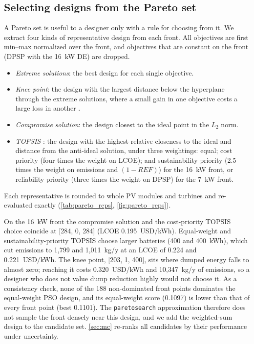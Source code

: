 \documentclass[final,3p,times]{elsarticle}
\begin{document}
\subsection{Selecting designs from the Pareto set\label{sec:pareto_select}}
A Pareto set is useful to a designer only with a rule for choosing from it. We extract four kinds of representative design from each front. All objectives are first min--max normalized over the front, and objectives that are constant on the front (DPSP with the 16~kW DE) are dropped.
\begin{itemize}
\item \textit{Extreme solutions}: the best design for each single objective.
\item \textit{Knee point}: the design with the largest distance below the hyperplane through the extreme solutions, where a small gain in one objective costs a large loss in another \cite{deb2011knee}.
\item \textit{Compromise solution}: the design closest to the ideal point in the $L_2$ norm.
\item \textit{TOPSIS} \cite{hwang1981topsis}: the design with the highest relative closeness to the ideal and distance from the anti-ideal solution, under three weightings: equal; cost priority (four times the weight on LCOE); and sustainability priority (2.5 times the weight on emissions and $(1-REF)$) for the 16~kW front, or reliability priority (three times the weight on DPSP) for the 7~kW front.
\end{itemize}
Each representative is rounded to whole PV modules and turbines and re-evaluated exactly (\cref{tab:pareto_reps}, \cref{fig:pareto_reps}).

On the 16~kW front the compromise solution and the cost-priority TOPSIS choice coincide at [284, 0, 284] (LCOE 0.195~USD/kWh). Equal-weight and sustainability-priority TOPSIS choose larger batteries (400 and 400~kWh), which cut emissions to 1,799 and 1,011~kg/y at an LCOE of 0.224 and 0.221~USD/kWh. The knee point, [203, 1, 400], sits where dumped energy falls to almost zero; reaching it costs 0.320~USD/kWh and 10,347~kg/y of emissions, so a designer who does not value dump reduction highly would not choose it. As a consistency check, none of the 188 non-dominated front points dominates the equal-weight PSO design, and its equal-weight score (0.1097) is lower than that of every front point (best 0.1101). The \texttt{paretosearch} approximation therefore does not sample the front densely near this design, and we add the weighted-sum design to the candidate set. \cref{sec:mc} re-ranks all candidates by their performance under uncertainty.
\end{document}
